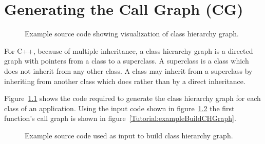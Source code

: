 \chapter{Generating the Call Graph (CG)}

\begin{figure}[!h]
{\indent
{\mySmallFontSize

\label{Tutorial:exampleBuildCH}

\begin{latexonly}
   
\end{latexonly}

\begin{htmlonly}
   
\end{htmlonly}

}
}
\caption{Example source code showing visualization of class hierarchy graph.}
\end{figure}

For C++, because of multiple inheritance, a class hierarchy graph is a directed graph 
with pointers from a class to a superclass. A superclass is a class which does not inherit
from any other class. A class may inherit from a superclass by inheriting from another
class which does rather than by a direct inheritance.

Figure~\ref{Tutorial:exampleBuildCH} shows the code required to generate
the class hierarchy graph for each class of an application.  Using the input code shown in
figure~\ref{Tutorial:exampleInputCode_BuildCH} the first function's call graph is
shown in figure~\ref{Tutorial:exampleBuildCHGraph}.

\begin{figure}[!h]
{\indent
{\mySmallFontSize

\label{Tutorial:exampleInputCode_BuildCH}

\begin{latexonly}
   
\end{latexonly}

\begin{htmlonly}
   
\end{htmlonly}

}
}
\caption{Example source code used as input to build class hierarchy graph.}
\end{figure}


